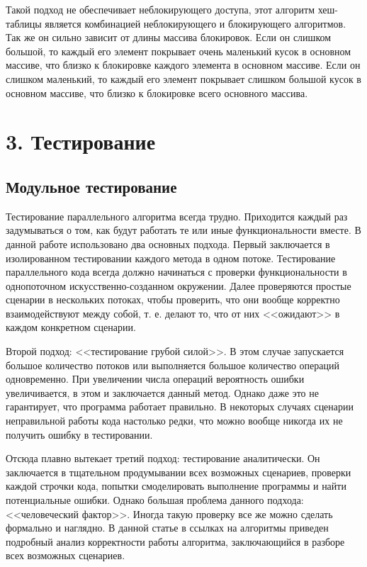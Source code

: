 \documentclass[12pt]{report}
\begin{document}
{		\par Такой подход не обеспечивает неблокирующего доступа, этот алгоритм хеш-таблицы является комбинацией неблокирующего и блокирующего алгоритмов. Так же он сильно зависит от длины массива блокировок. Если он слишком большой, то каждый его элемент покрывает очень маленький кусок в основном массиве, что близко к блокировке каждого элемента в основном массиве. Если он слишком маленький, то каждый его элемент покрывает слишком большой кусок в основном массиве, что близко к блокировке всего основного массива.
		
		\newpage
		
		\chapter{3. Тестирование}
		\section{Модульное тестирование}
		\par Тестирование параллельного алгоритма всегда трудно. Приходится каждый раз задумываться о том, как будут работать те или иные функциональности вместе. В данной работе использовано два основных подхода. Первый заключается в изолированном тестировании каждого метода в одном потоке. Тестирование параллельного кода всегда должно начинаться с проверки функциональности в однопоточном искусственно-созданном окружении. Далее проверяются простые сценарии в нескольких потоках, чтобы проверить, что они вообще корректно взаимодействуют между собой, т. е. делают то, что от них <<ожидают>> в каждом конкретном сценарии.
		\par Второй подход: <<тестирование грубой силой>>. В этом случае запускается большое количество потоков или выполняется большое количество операций одновременно. При увеличении числа операций вероятность ошибки увеличивается, в этом и заключается данный метод. Однако даже это не гарантирует, что программа работает правильно. В некоторых случаях сценарии неправильной работы кода настолько редки, что можно вообще никогда их не получить ошибку в тестировании.
		\par Отсюда плавно вытекает третий подход: тестирование аналитически. Он заключается в тщательном продумывании всех возможных сценариев, проверки каждой строчки кода, попытки смоделировать выполнение программы и найти потенциальные ошибки. Однако большая проблема данного подхода: <<человеческий фактор>>. Иногда такую проверку все же можно сделать формально и наглядно. В данной статье в ссылках на алгоритмы приведен подробный анализ корректности работы алгоритма, заключающийся в разборе всех возможных сценариев.
}
\end{document}
